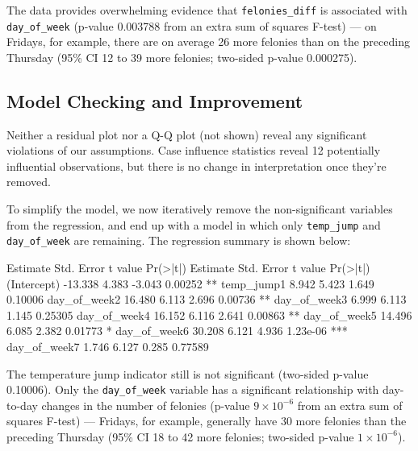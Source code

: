 \documentclass[11pt,notitlepage]{article}
\newenvironment{codeSmall}%
   {\par\noindent\adjustbox{margin=1ex,bgcolor=shadecolor,margin=0ex \medskipamount}\bgroup\minipage\linewidth\verbatim\footnotesize}%
   {\endverbatim\endminipage\egroup}
\begin{document}
The data provides overwhelming evidence that \texttt{felonies_diff} is associated with \texttt{day_of_week} (p-value 0.003788 from an extra sum of squares F-test) --- on Fridays, for example, there are on average 26 more felonies than on the preceding Thursday (95\% CI 12 to 39 more felonies; two-sided p-value 0.000275).


\subsection{Model Checking and Improvement}
\label{sec:modelFeloniesDiffModelCheckingImprovement}


Neither a residual plot nor a Q-Q plot (not shown) reveal any significant violations of our assumptions. Case influence statistics reveal 12 potentially influential observations, but there is no change in interpretation once they're removed.

To simplify the model, we now iteratively remove the non-significant variables from the regression, and end up with a model in which only \texttt{temp_jump} and \texttt{day_of_week} are remaining. The regression summary is shown below:

\begin{codeSmall}
             Estimate Std. Error t value Pr(>|t|)    
             Estimate Std. Error t value Pr(>|t|)    
(Intercept)   -13.338      4.383  -3.043  0.00252 ** 
temp_jump1      8.942      5.423   1.649  0.10006    
day_of_week2   16.480      6.113   2.696  0.00736 ** 
day_of_week3    6.999      6.113   1.145  0.25305    
day_of_week4   16.152      6.116   2.641  0.00863 ** 
day_of_week5   14.496      6.085   2.382  0.01773 *  
day_of_week6   30.208      6.121   4.936 1.23e-06 ***
day_of_week7    1.746      6.127   0.285  0.77589    
\end{codeSmall}


The temperature jump indicator still is not significant (two-sided p-value 0.10006). Only the \texttt{day_of_week} variable has a significant relationship with day-to-day changes in the number of felonies (p-value $9 \times 10^{-6}$ from an extra sum of squares F-test) --- Fridays, for example, generally have 30 more felonies than the preceding Thursday (95\% CI 18 to 42 more felonies; two-sided p-value $1 \times 10^{-6}$).
\end{document}
